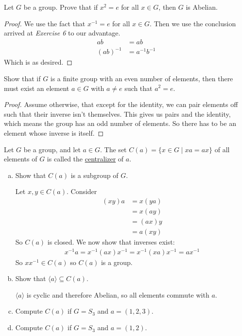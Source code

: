 \exercise Let $G$ be a group. Prove that if $x^2 = e$ for all $x\in G$, then $G$ is Abelian. 
\begin{proof}
We use the fact that $x^{-1}=e$ for all $x\in G$. Then we use the conclusion arrived at \textit{Exercise 6} to our advantage. 
\begin{align*}
ab &= ab \\
(ab)^{-1} &= a^{-1}b^{-1}
\end{align*}
	Which is as desired. 
\end{proof}

\exercise Show that if $G$ is a finite group with an even number of elements, then there must exist an element $a\in G$ with $a\neq e$ such that $a^2 = e$. 
\begin{proof}
Assume otherwise, that except for the identity, we can pair elements off such that their inverse isn't themselves. This gives us pairs and the identity, which means the group has an odd number of elements. So there has to be an element whose inverse is itself. 	
\end{proof}

\exercise Let $G$ be a group, and let $a\in G$. The set $C(a)=\{x\in G\mid xa=ax\}$ of all elements of $G$ is called the \ul{centralizer} of $a$. 
\begin{enumerate}[(a)]
	\item Show that $C(a)$ is a subgroup of $G$. 
	
	Let $x, y\in C(a)$. Consider
	\begin{align*}
	(xy)a &= x(ya) \\
	 &= x(ay) \\
	 &= (ax)y \\
	 &= a(xy)
	\end{align*}
	So $C(a)$ is closed. We now show that inverses exist: 
	\begin{align*}
		x^{-1}a = x^{-1}(ax)x^{-1} = x^{-1}(xa)x^{-1} = ax^{-1}
	\end{align*}
	So $xx^{-1}\in C(a)$ so $C(a)$ is a group. 
	\item Show that $\langle a\rangle \subseteq C(a)$. 
	
	$\langle a\rangle$ is cyclic and therefore Abelian, so all elements commute with $a$. 
	\item Compute $C(a)$ if $G = S_3$ and $a = (1, 2, 3)$. 
	\item Compute $C(a)$ if $G=S_3$ and $a=(1, 2)$. 
\end{enumerate}
